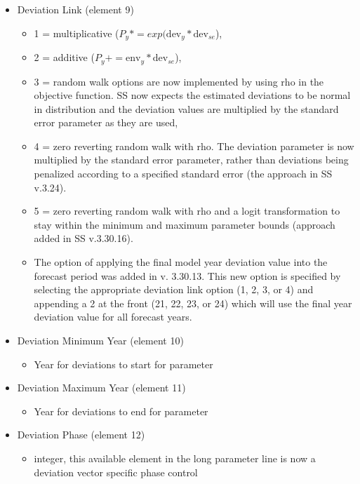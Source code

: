 \begin{itemize}
\item Deviation Link (element 9)
	\begin{itemize}
		\item 1 = multiplicative ($P_y*=exp(\text{dev}_y*\text{dev}_{se}$),
		\item 2 = additive ($P_y+=\text{env}_y*\text{dev}_{se}$),
		\item 3 = random walk options are now implemented by using rho in the objective function. SS now expects the estimated deviations to be normal in distribution and the deviation values are multiplied by the standard error parameter as they are used,
		\item 4 = zero reverting random walk with rho. The deviation parameter is now multiplied by the standard error parameter, rather than deviations being penalized according to a specified standard error (the approach in SS v.3.24).
		\item 5 = zero reverting random walk with rho and a logit transformation to stay within the minimum and maximum parameter bounds (approach added in SS v.3.30.16).
		\item The option of applying the final model year deviation value into the forecast period was added in v. 3.30.13.  This new option is specified by selecting the appropriate deviation link option (1, 2, 3, or 4) and appending a 2 at the front (21, 22, 23, or 24) which will use the final year deviation value for all forecast years. 
	\end{itemize}
	
\item Deviation  Minimum Year (element 10)
	\begin{itemize}
		\item Year for deviations to start for parameter
	\end{itemize}
	
\item Deviation  Maximum Year (element 11)
	\begin{itemize}
		\item Year for deviations to end for parameter
	\end{itemize}
	
\item Deviation Phase (element 12)
	\begin{itemize}
		\item integer, this available element in the long parameter line is now a deviation vector specific phase control
	\end{itemize}
	

\end{itemize}
